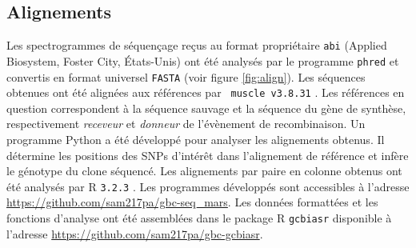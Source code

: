 
\subsection{Alignements}
\label{subsec:align}

Les spectrogrammes de séquençage reçus au format propriétaire \texttt{abi}
(Applied Biosystem, Foster City, États-Unis) ont été analysés par le programme
\texttt{phred} \cite{ewing_base-calling_1998} et convertis en format universel
\texttt{FASTA} (voir figure \ref{fig:align}). Les séquences obtenues ont été
alignées aux références par \texttt{ muscle v3.8.31} \cite{edgar_muscle:_2004}.
Les références en question correspondent à la séquence sauvage et la séquence du
gène de synthèse, respectivement \emph{receveur} et \emph{donneur} de
l'évènement de recombinaison. Un programme Python \cite{cock_biopython:_2009} a
été développé pour analyser les alignements obtenus. Il détermine les positions
des SNPs d'intérêt dans l'alignement de référence et infère le génotype du clone
séquencé. Les alignements par paire en colonne obtenus ont été analysés par
\textrm{R} \texttt{3.2.3} \cite{r_core_team_r:_2015}. Les programmes développés
sont accessibles à l'adresse \url{https://github.com/sam217pa/gbc-seq_mars}. Les
données formattées et les fonctions d'analyse ont été assemblées dans le package
\textrm{R} \texttt{gcbiasr} disponible à l'adresse
\url{https://github.com/sam217pa/gbc-gcbiasr}.

